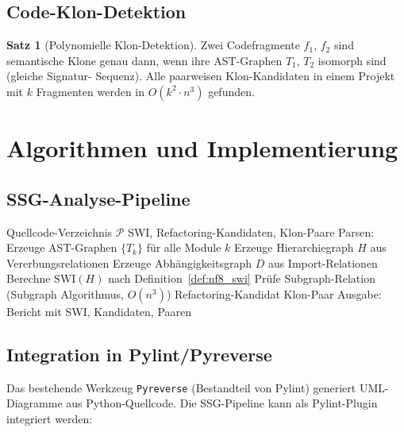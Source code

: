 ﻿\documentclass[a4paper,12pt]{scrreprt}
\theoremstyle{definition}
\newtheorem{satz}{Satz}[section]
\begin{document}
\subsection{Code-Klon-Detektion}

\begin{satz}[Polynomielle Klon-Detektion]
  Zwei Codefragmente $f_1$, $f_2$ sind semantische Klone genau dann,
  wenn ihre AST-Graphen $T_1$, $T_2$ isomorph sind (gleiche Signatur-
  Sequenz). Alle paarweisen Klon-Kandidaten in einem Projekt mit
  $k$ Fragmenten werden in $O(k^2 \cdot n^3)$ gefunden.
\end{satz}

\section{Algorithmen und Implementierung}

\subsection{SSG-Analyse-Pipeline}

\begin{algorithm}[H]
\caption{SSG-Qualitätsanalyse eines Softwareprojekts}
\label{alg:nf8}
\begin{algorithmic}[1]
\Require Quellcode-Verzeichnis $\mathcal{P}$
\Ensure SWI, Refactoring-Kandidaten, Klon-Paare
\State Parsen: Erzeuge AST-Graphen $\{T_k\}$ für alle Module $k$
\State Erzeuge Hierarchiegraph $H$ aus Vererbungsrelationen
\State Erzeuge Abhängigkeitsgraph $D$ aus Import-Relationen
\State Berechne $\mathrm{SWI}(H)$ nach Definition~\ref{def:nf8_swi}
  \State Prüfe Subgraph-Relation (Subgraph Algorithmus, $O(n^3)$)
    \State Refactoring-Kandidat
  \EndIf
    \State Klon-Paar
  \EndIf
\EndFor
\State Ausgabe: Bericht mit SWI, Kandidaten, Paaren
\end{algorithmic}
\end{algorithm}

\subsection{Integration in Pylint/Pyreverse}

Das bestehende Werkzeug \texttt{Pyreverse} (Bestandteil von Pylint)
generiert UML-Diagramme aus Python-Quellcode. Die SSG-Pipeline
kann als Pylint-Plugin integriert werden:
\end{document}
